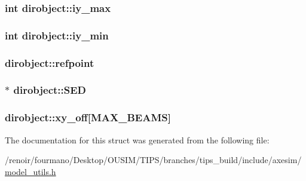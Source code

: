 \label{structdirobject_ac068f35c585eec4cd1e5d3392c2dd698}
\hypertarget{structdirobject_a3b36973dd52d158c059bfe6587a04244}{
\subsubsection[{iy\_\-max}]{\setlength{\rightskip}{0pt plus 5cm}int {\bf dirobject::iy\_\-max}}}
\label{structdirobject_a3b36973dd52d158c059bfe6587a04244}
\hypertarget{structdirobject_af24c9a92fa18516591e43d96eec13272}{
\subsubsection[{iy\_\-min}]{\setlength{\rightskip}{0pt plus 5cm}int {\bf dirobject::iy\_\-min}}}
\label{structdirobject_af24c9a92fa18516591e43d96eec13272}
\hypertarget{structdirobject_a66ec2727d2a5269c84804a89626834fa}{
\subsubsection[{refpoint}]{ {\bf dirobject::refpoint}}}
\label{structdirobject_a66ec2727d2a5269c84804a89626834fa}
\hypertarget{structdirobject_a79645e83aebf3988bd3464b2079d24c1}{
\subsubsection[{SED}]{$\ast$ {\bf dirobject::SED}}}
\label{structdirobject_a79645e83aebf3988bd3464b2079d24c1}
\hypertarget{structdirobject_a804b505c34bbecd0eb09832e34cbd5ce}{
\subsubsection[{xy\_\-off}]{ {\bf dirobject::xy\_\-off}\mbox{[}MAX\_\-BEAMS\mbox{]}}}
\label{structdirobject_a804b505c34bbecd0eb09832e34cbd5ce}


The documentation for this struct was generated from the following file:\begin{DoxyCompactItemize}
\item 
/renoir/fourmano/Desktop/OUSIM/TIPS/branches/tips\_\-build/include/axesim/\hyperlink{model__utils_8h}{model\_\-utils.h}\end{DoxyCompactItemize}
